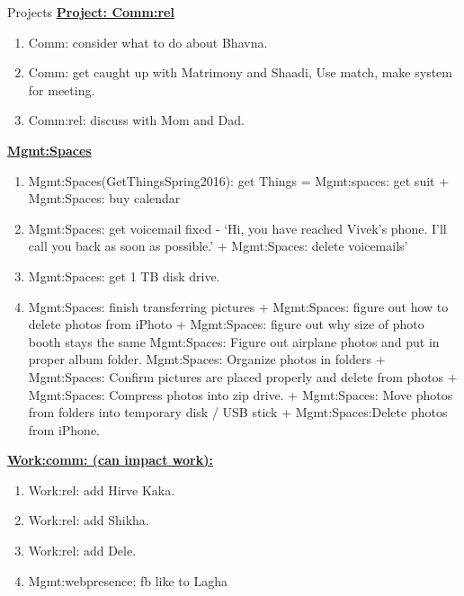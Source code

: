 \begin{block}{Projects}
{\underline{\bf Project: Comm:rel}}
\begin{enumerate} 
  \tiny \item \tiny Comm: consider what to do about Bhavna.
\item \tiny Comm: get caught up with Matrimony and Shaadi, Use match,
  make system for meeting. 
\item \tiny Comm:rel: discuss with Mom and Dad. 
\end{enumerate} 

{\underline{\bf Mgmt:Spaces}}\\
\begin{enumerate} 
\item \tiny Mgmt:Spaces(GetThingsSpring2016): get Things = Mgmt:spaces: get suit
+ Mgmt:Spaces: buy calendar 
\item \tiny Mgmt:Spaces: get voicemail fixed  - ‘Hi, you have reached Vivek’s
phone. I’ll call you back as soon as possible.’ + Mgmt:Spaces: delete
voicemails’ 
\item \tiny Mgmt:Spaces: get 1 TB disk drive. 
\item \tiny Mgmt:Spaces: finish transferring pictures + Mgmt:Spaces: figure out
how to delete photos from iPhoto + Mgmt:Spaces: figure out why size of
photo booth stays the same  Mgmt:Spaces: Figure out airplane photos
and put in proper album folder. Mgmt:Spaces: Organize photos in
folders + Mgmt:Spaces: Confirm pictures are placed properly and delete
from photos + Mgmt:Spaces: Compress photos into zip drive. +
Mgmt:Spaces: Move photos from folders into temporary disk / USB stick 
+ Mgmt:Spaces:Delete photos from iPhone.
\end{enumerate} 

{\underline{\bf Work:comm: (can impact work):}}
\begin{enumerate}
\item \tiny Work:rel: add Hirve Kaka. 
\item \tiny Work:rel: add Shikha.
\item \tiny Work:rel: add Dele. 
\item \tiny Mgmt:webpresence: fb like to Lagha
\end{enumerate}


\end{block}
